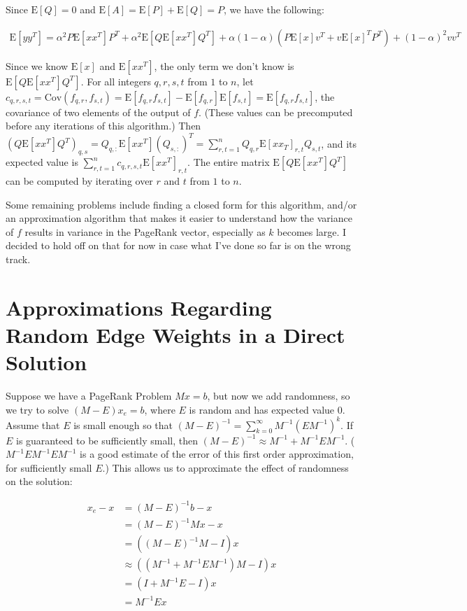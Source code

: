 \documentclass{article}
\newcommand \E[1] {\mathrm E \left[#1\right]} %
\newcommand \Cov[2] {\mathrm {Cov} (#1, #2)} %
\newcommand \inv [1] {{#1}^{-1}} %
\begin{document}
Since $\E Q = 0$ and $\E A = \E P + \E Q = P$, we have the following:

\begin{align*}
\E{yy^T} = \alpha^2 P\E{xx^T}P^T + \alpha^2 \E{Q\E{xx^T}Q^T} +
\alpha(1-\alpha)(P \E x v^T + v {\E x}^T P^T )+ (1-\alpha)^2 vv^T
\end{align*}

Since we know $\E x$ and $\E{xx^T}$, the only term we don't know is
$\E{Q\E{xx^T}Q^T}$. For all integers $q,r,s,t$ from $1$ to $n$, let
$c_{q,r,s,t} = \Cov{f_{q,r}}{f_{s,t}} =
\E{f_{q,r}f_{s,t}}-\E{f_{q,r}}\E{f_{s,t}}=\E{f_{q,r}f_{s,t}}$, the
covariance of two elements of the output of $f$. (These values can be
precomputed before any iterations of this algorithm.) Then
$(Q\E{xx^T}Q^T)_{q,s} = Q_{q,:}\E{xx^T}(Q_{s,:})^T = \sum_{r,t=1}^n
Q_{q,r}\E{xx_T}_{r,t}Q_{s,t}$, and its expected value is
$\sum_{r,t=1}^n c_{q,r,s,t}\E{xx^T}_{r,t}$. The entire matrix
$\E{Q\E{xx^T}Q^T}$ can be computed by iterating over $r$ and $t$ from
$1$ to $n$.

Some remaining problems include finding a closed form for this
algorithm, and/or an approximation algorithm that makes it easier to
understand how the variance of $f$ results in variance in the PageRank
vector, especially as $k$ becomes large. I decided to hold off on that
for now in case what I've done so far is on the wrong track.

\section{Approximations Regarding Random Edge Weights in a Direct Solution}

Suppose we have a PageRank Problem $Mx=b$, but now we add randomness,
so we try to solve $(M-E)x_e = b$, where $E$ is random and has
expected value 0. Assume that $E$ is small enough so that $(M-E)^{-1}
= \sum_{k=0}^\infty \inv M (E\inv M)^k$. If $E$ is guaranteed to be
sufficiently small, then $\inv{(M-E)} \approx \inv M + \inv M E \inv
M$. ($\inv M E\inv M E\inv M$ is a good estimate of the error of this
first order approximation, for sufficiently small $E$.) This allows us
to approximate the effect of randomness on the solution:

\begin{align*}
x_e - x &= \inv{(M-E)}b - x\\ &= \inv{(M-E)}Mx - x\\ &=
\left(\inv{(M-E)}M-I\right)x\\ &\approx \left((\inv M + \inv M E \inv
M)M-I\right)x\\ &= (I + \inv M E - I)x\\ &= \inv M E x
\end{align*}
\end{document}
